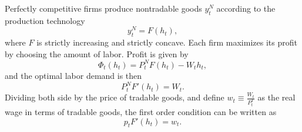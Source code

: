 Perfectly competitive firms produce nontradable goods $y^N_t$ according to the production technology
\begin{equation}
    \label{eq:production}
    y^N_t = F(h_t),
\end{equation}
where $F$ is strictly increasing and strictly concave. Each firm maximizes its profit by choosing the amount of labor. Profit is given by
\begin{equation}
    \label{eq:profit}
    \Phi_t(h_t) = P^N_t F(h_t) - W_t h_t,
\end{equation}
and the optimal labor demand is then
\begin{equation*}
    P^N_t F'(h_t) = W_t.
\end{equation*}
Dividing both side by the price of tradable goods, and define $w_t \equiv \frac{W_t}{P^T_t}$ as the real wage in terms of tradable goods, the first order condition can be written as
\begin{equation}
    \label{eq:firm-FOC}
    p_t F'(h_t) = w_t.
\end{equation}